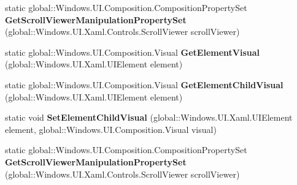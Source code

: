 \begin{DoxyCompactItemize}
\item 
\mbox{\label{class_windows_1_1_u_i_1_1_xaml_1_1_hosting_1_1_element_composition_preview_a97dcf75bcb6cd9ebb00b1029e9dc2b7d}} 
static global\+::\+Windows.\+U\+I.\+Composition.\+Composition\+Property\+Set {\bfseries Get\+Scroll\+Viewer\+Manipulation\+Property\+Set} (global\+::\+Windows.\+U\+I.\+Xaml.\+Controls.\+Scroll\+Viewer scroll\+Viewer)
\item 
\mbox{\label{class_windows_1_1_u_i_1_1_xaml_1_1_hosting_1_1_element_composition_preview_a197394bc43fd737a554e4e888ca99c71}} 
static global\+::\+Windows.\+U\+I.\+Composition.\+Visual {\bfseries Get\+Element\+Visual} (global\+::\+Windows.\+U\+I.\+Xaml.\+U\+I\+Element element)
\item 
\mbox{\label{class_windows_1_1_u_i_1_1_xaml_1_1_hosting_1_1_element_composition_preview_a8187f1a70143d04232934a796b4099ef}} 
static global\+::\+Windows.\+U\+I.\+Composition.\+Visual {\bfseries Get\+Element\+Child\+Visual} (global\+::\+Windows.\+U\+I.\+Xaml.\+U\+I\+Element element)
\item 
\mbox{\label{class_windows_1_1_u_i_1_1_xaml_1_1_hosting_1_1_element_composition_preview_a214faabff7d601f8d727a4b0f000f677}} 
static void {\bfseries Set\+Element\+Child\+Visual} (global\+::\+Windows.\+U\+I.\+Xaml.\+U\+I\+Element element, global\+::\+Windows.\+U\+I.\+Composition.\+Visual visual)
\item 
\mbox{\label{class_windows_1_1_u_i_1_1_xaml_1_1_hosting_1_1_element_composition_preview_a97dcf75bcb6cd9ebb00b1029e9dc2b7d}} 
static global\+::\+Windows.\+U\+I.\+Composition.\+Composition\+Property\+Set {\bfseries Get\+Scroll\+Viewer\+Manipulation\+Property\+Set} (global\+::\+Windows.\+U\+I.\+Xaml.\+Controls.\+Scroll\+Viewer scroll\+Viewer)
\item 
\mbox{\label{class_windows_1_1_u_i_1_1_xaml_1_1_hosting_1_1_element_composition_preview_a197394bc43fd737a554e4e888ca99c71}} 

\end{DoxyCompactItemize}
